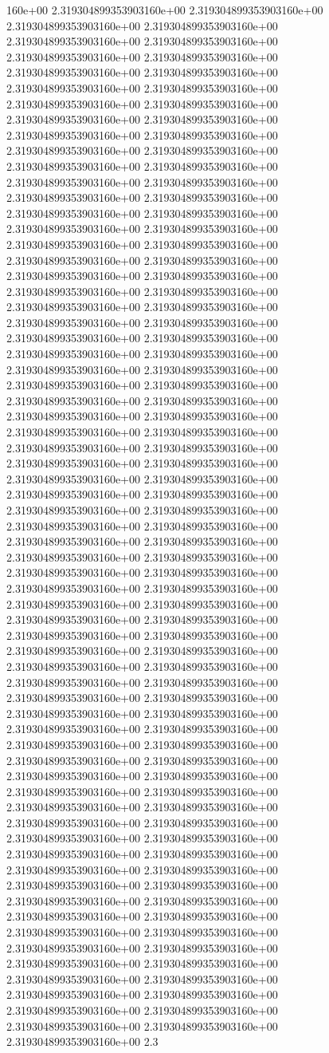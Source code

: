 160e+00	2.319304899353903160e+00	2.319304899353903160e+00	2.319304899353903160e+00	2.319304899353903160e+00	2.319304899353903160e+00	2.319304899353903160e+00	2.319304899353903160e+00	2.319304899353903160e+00	2.319304899353903160e+00	2.319304899353903160e+00	2.319304899353903160e+00	2.319304899353903160e+00	2.319304899353903160e+00	2.319304899353903160e+00	2.319304899353903160e+00	2.319304899353903160e+00	2.319304899353903160e+00	2.319304899353903160e+00	2.319304899353903160e+00	2.319304899353903160e+00	2.319304899353903160e+00	2.319304899353903160e+00	2.319304899353903160e+00	2.319304899353903160e+00	2.319304899353903160e+00	2.319304899353903160e+00	2.319304899353903160e+00	2.319304899353903160e+00	2.319304899353903160e+00	2.319304899353903160e+00	2.319304899353903160e+00	2.319304899353903160e+00	2.319304899353903160e+00	2.319304899353903160e+00	2.319304899353903160e+00	2.319304899353903160e+00	2.319304899353903160e+00	2.319304899353903160e+00	2.319304899353903160e+00	2.319304899353903160e+00	2.319304899353903160e+00	2.319304899353903160e+00	2.319304899353903160e+00	2.319304899353903160e+00	2.319304899353903160e+00	2.319304899353903160e+00	2.319304899353903160e+00	2.319304899353903160e+00	2.319304899353903160e+00	2.319304899353903160e+00	2.319304899353903160e+00	2.319304899353903160e+00	2.319304899353903160e+00	2.319304899353903160e+00	2.319304899353903160e+00	2.319304899353903160e+00	2.319304899353903160e+00	2.319304899353903160e+00	2.319304899353903160e+00	2.319304899353903160e+00	2.319304899353903160e+00	2.319304899353903160e+00	2.319304899353903160e+00	2.319304899353903160e+00	2.319304899353903160e+00	2.319304899353903160e+00	2.319304899353903160e+00	2.319304899353903160e+00	2.319304899353903160e+00	2.319304899353903160e+00	2.319304899353903160e+00	2.319304899353903160e+00	2.319304899353903160e+00	2.319304899353903160e+00	2.319304899353903160e+00	2.319304899353903160e+00	2.319304899353903160e+00	2.319304899353903160e+00	2.319304899353903160e+00	2.319304899353903160e+00	2.319304899353903160e+00	2.319304899353903160e+00	2.319304899353903160e+00	2.319304899353903160e+00	2.319304899353903160e+00	2.319304899353903160e+00	2.319304899353903160e+00	2.319304899353903160e+00	2.319304899353903160e+00	2.319304899353903160e+00	2.319304899353903160e+00	2.319304899353903160e+00	2.319304899353903160e+00	2.319304899353903160e+00	2.319304899353903160e+00	2.319304899353903160e+00	2.319304899353903160e+00	2.319304899353903160e+00	2.319304899353903160e+00	2.319304899353903160e+00	2.319304899353903160e+00	2.319304899353903160e+00	2.319304899353903160e+00	2.319304899353903160e+00	2.319304899353903160e+00	2.319304899353903160e+00	2.319304899353903160e+00	2.319304899353903160e+00	2.319304899353903160e+00	2.319304899353903160e+00	2.319304899353903160e+00	2.319304899353903160e+00	2.319304899353903160e+00	2.319304899353903160e+00	2.319304899353903160e+00	2.319304899353903160e+00	2.319304899353903160e+00	2.319304899353903160e+00	2.319304899353903160e+00	2.319304899353903160e+00	2.319304899353903160e+00	2.319304899353903160e+00	2.319304899353903160e+00	2.319304899353903160e+00	2.319304899353903160e+00	2.319304899353903160e+00	2.319304899353903160e+00	2.319304899353903160e+00	2.319304899353903160e+00	2.319304899353903160e+00	2.319304899353903160e+00	2.319304899353903160e+00	2.319304899353903160e+00	2.3